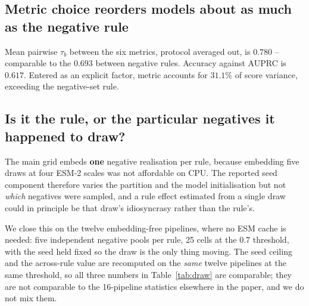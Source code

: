 \documentclass[11pt,a4paper]{article}
\begin{document}
\subsection{Metric choice reorders models about as much as the negative rule}

Mean pairwise $\tau_b$ between the six metrics, protocol averaged out, is $0.780$ --
comparable to the $0.693$ between negative rules. Accuracy against AUPRC is $0.617$.
Entered as an explicit factor, metric accounts for $31.1\%$ of score variance, exceeding
the negative-set rule.

\subsection{Is it the rule, or the particular negatives it happened to draw?}
\label{sec:draw}

The main grid embeds \textbf{one} negative realisation per rule, because embedding five
draws at four ESM-2 scales was not affordable on CPU. The reported seed component therefore
varies the partition and the model initialisation but not \emph{which} negatives were
sampled, and a rule effect estimated from a single draw could in principle be that draw's
idiosyncrasy rather than the rule's.

We close this on the twelve embedding-free pipelines, where no ESM cache is needed: five
independent negative pools per rule, 25 cells at the $0.7$ threshold, with the seed held
fixed so the draw is the only thing moving. The seed ceiling and the across-rule value are
recomputed on the \emph{same} twelve pipelines at the same threshold, so all three numbers
in Table~\ref{tab:draw} are comparable; they are not comparable to the 16-pipeline
statistics elsewhere in the paper, and we do not mix them.
\end{document}
